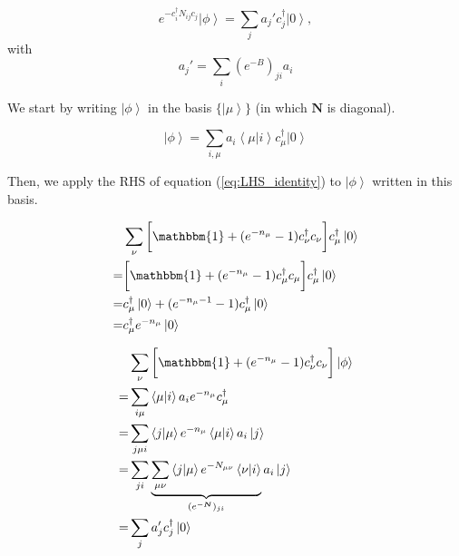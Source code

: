 \begin{equation}
e^{-c_i^\dagger N_{ij} c_j} \left| \phi \right\rangle = \sum_j a_j' c_j^\dagger \left| 0 \right\rangle , 
\end{equation}
with
\begin{equation}
a_j' = \sum_{i} (e^{-B})_{ji} a_i
\end{equation}

We start by writing $\left| \phi \right\rangle$ in the basis $\{ \left| \mu \right\rangle \}$ (in which $\bm N$ is diagonal).

\begin{equation}
\left| \phi \right\rangle = \sum_{i,\mu} a_i \left\langle \mu | i \right\rangle c_\mu^\dagger \left| 0 \right\rangle
\end{equation}

Then, we apply the RHS of equation (\ref{eq:LHS_identity}) to $\left| \phi \right\rangle$ written in this basis.

\begin{equation}\label{eq:proofAuxIdentity}
\begin{split}
&\sum_\nu \bigg[ \mathbbm{1} + ( e^{-n_\mu} - 1 ) c_\nu^\dagger c_\nu \bigg] c_\mu^\dagger \left| 0 \right\rangle \\
=&\bigg[ \mathbbm{1} + ( e^{-n_\mu} - 1 ) c_\mu^\dagger c_\mu \bigg] c_\mu^\dagger \left| 0 \right\rangle \\
=& c_\mu^\dagger \left| 0 \right\rangle + (e^{-n_\mu - 1} - 1) c_\mu^\dagger \left| 0 \right\rangle \\
=& c_\mu^\dagger e^{-n_\mu} \left| 0 \right\rangle
\end{split}
\end{equation}

\begin{equation}
\begin{split}
&\sum_\nu \bigg[ \mathbbm{1} + ( e^{-n_\mu} - 1 ) c_\nu^\dagger c_\nu \bigg] \left| \phi \right\rangle \\
=& \sum_{i\mu} \left\langle \mu | i \right\rangle a_i e^{-n_\mu} c_\mu^\dagger \\
=& \sum_{j\mu i} \left\langle j | \mu \right\rangle e^{-n_\mu} \left\langle \mu | i \right\rangle a_i \left| j \right\rangle \\
=& \sum_{j i} \underbrace{\sum_{\mu\nu} \left\langle j | \mu \right\rangle e^{-N_{\mu\nu}} \left\langle \nu | i \right\rangle}_{(e^{-\bm N})_{ji}} a_i \left| j \right\rangle \\
=& \sum_j a_j' c_j^\dagger \left| 0 \right\rangle
\end{split}
\end{equation}

